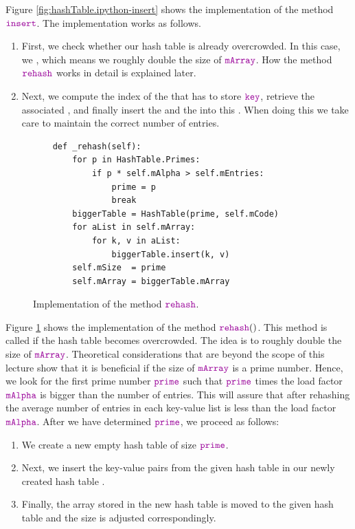 Figure \ref{fig:hashTable.ipython-insert} shows the implementation of the method $\mytt{insert}$.
The implementation works as follows.
\begin{enumerate}
\item First, we check whether our hash table is already overcrowded.
      In this case, we , which means we roughly double the size of $\mytt{mArray}$.
      How the method $\mytt{rehash}$ works in detail is explained later.
\item Next, we compute the index of the  that has to store
      $\mytt{key}$, retrieve the associated , and finally insert the  and the
       into this .
      When doing this we take care to maintain the correct number of entries.
\end{enumerate}


\begin{figure}[!ht]
\centering
\begin{verbatim}
    def _rehash(self):
        for p in HashTable.Primes:
            if p * self.mAlpha > self.mEntries:
                prime = p
                break
        biggerTable = HashTable(prime, self.mCode)
        for aList in self.mArray:
            for k, v in aList:
                biggerTable.insert(k, v)
        self.mSize  = prime
        self.mArray = biggerTable.mArray
\end{verbatim}
\vspace*{-0.3cm}
\caption{Implementation of the method $\mytt{rehash}$.}
\label{fig:hashTable.ipython-rehash}
\end{figure}


Figure \ref{fig:hashTable.ipython-rehash} shows the implementation of the method
$\mytt{rehash}()$.  This method is called if the hash table becomes overcrowded.  The idea is to
roughly double the size of $\mytt{mArray}$.  Theoretical considerations that are  beyond the scope
of this lecture show that it is beneficial if the size of $\mytt{mArray}$ is a prime number.
Hence, we look for the first prime number $\mytt{prime}$ such that $\mytt{prime}$ times the load
factor $\mytt{mAlpha}$ is bigger than the
number of entries.  This will assure that after rehashing the average number of entries in each key-value
list is less than the load factor $\mytt{mAlpha}$.  After we have determined $\mytt{prime}$, we
proceed as follows: 
\begin{enumerate}
\item We create a new empty hash table of size $\mytt{prime}$.
\item Next, we insert the key-value pairs from the given hash table in our newly created hash table
      .
\item Finally, the array stored in the new hash table is moved to the given hash table
      and the size is adjusted correspondingly.
\end{enumerate}


